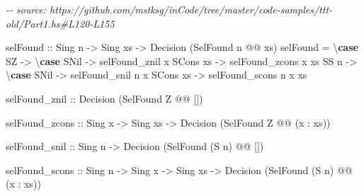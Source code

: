 \documentclass[]{article}
\newenvironment{Shaded}{}{}
\newcommand{\CommentTok}[1]{\textcolor[rgb]{0.38,0.63,0.69}{\textit{#1}}}
\newcommand{\DataTypeTok}[1]{\textcolor[rgb]{0.56,0.13,0.00}{#1}}
\newcommand{\KeywordTok}[1]{\textcolor[rgb]{0.00,0.44,0.13}{\textbf{#1}}}
\newcommand{\NormalTok}[1]{#1}
\newcommand{\OperatorTok}[1]{\textcolor[rgb]{0.40,0.40,0.40}{#1}}
\newcommand{\OtherTok}[1]{\textcolor[rgb]{0.00,0.44,0.13}{#1}}
\begin{document}
\begin{Shaded}
\begin{Highlighting}[]
\CommentTok{{-}{-} source: https://github.com/mstksg/inCode/tree/master/code{-}samples/ttt{-}old/Part1.hs\#L120{-}L155}

\NormalTok{selFound}
\OtherTok{    ::} \DataTypeTok{Sing}\NormalTok{ n}
    \OtherTok{{-}\textgreater{}} \DataTypeTok{Sing}\NormalTok{ xs}
    \OtherTok{{-}\textgreater{}} \DataTypeTok{Decision}\NormalTok{ (}\DataTypeTok{SelFound}\NormalTok{ n }\OperatorTok{@@}\NormalTok{ xs)}
\NormalTok{selFound }\OtherTok{=}\NormalTok{ \textbackslash{}}\KeywordTok{case}
    \DataTypeTok{SZ} \OtherTok{{-}\textgreater{}}\NormalTok{ \textbackslash{}}\KeywordTok{case}
      \DataTypeTok{SNil}         \OtherTok{{-}\textgreater{}}\NormalTok{ selFound\_znil}
\NormalTok{      x }\OtherTok{\textasciigrave{}SCons\textasciigrave{}}\NormalTok{ xs }\OtherTok{{-}\textgreater{}}\NormalTok{ selFound\_zcons x xs}
    \DataTypeTok{SS}\NormalTok{ n }\OtherTok{{-}\textgreater{}}\NormalTok{ \textbackslash{}}\KeywordTok{case}
      \DataTypeTok{SNil}         \OtherTok{{-}\textgreater{}}\NormalTok{ selFound\_snil n}
\NormalTok{      x }\OtherTok{\textasciigrave{}SCons\textasciigrave{}}\NormalTok{ xs }\OtherTok{{-}\textgreater{}}\NormalTok{ selFound\_scons n x xs}

\NormalTok{selFound\_znil}
\OtherTok{    ::} \DataTypeTok{Decision}\NormalTok{ (}\DataTypeTok{SelFound} \DataTypeTok{\textquotesingle{}Z} \OperatorTok{@@}\NormalTok{ \textquotesingle{}[])}

\NormalTok{selFound\_zcons}
\OtherTok{    ::} \DataTypeTok{Sing}\NormalTok{ x}
    \OtherTok{{-}\textgreater{}} \DataTypeTok{Sing}\NormalTok{ xs}
    \OtherTok{{-}\textgreater{}} \DataTypeTok{Decision}\NormalTok{ (}\DataTypeTok{SelFound} \DataTypeTok{\textquotesingle{}Z} \OperatorTok{@@}\NormalTok{ (x \textquotesingle{}}\OperatorTok{:}\NormalTok{ xs))}

\NormalTok{selFound\_snil}
\OtherTok{    ::} \DataTypeTok{Sing}\NormalTok{ n}
    \OtherTok{{-}\textgreater{}} \DataTypeTok{Decision}\NormalTok{ (}\DataTypeTok{SelFound}\NormalTok{ (}\DataTypeTok{\textquotesingle{}S}\NormalTok{ n) }\OperatorTok{@@}\NormalTok{ \textquotesingle{}[])}

\NormalTok{selFound\_scons}
\OtherTok{    ::} \DataTypeTok{Sing}\NormalTok{ n}
    \OtherTok{{-}\textgreater{}} \DataTypeTok{Sing}\NormalTok{ x}
    \OtherTok{{-}\textgreater{}} \DataTypeTok{Sing}\NormalTok{ xs}
    \OtherTok{{-}\textgreater{}} \DataTypeTok{Decision}\NormalTok{ (}\DataTypeTok{SelFound}\NormalTok{ (}\DataTypeTok{\textquotesingle{}S}\NormalTok{ n) }\OperatorTok{@@}\NormalTok{ (x \textquotesingle{}}\OperatorTok{:}\NormalTok{ xs))}
\end{Highlighting}
\end{Shaded}
\end{document}
